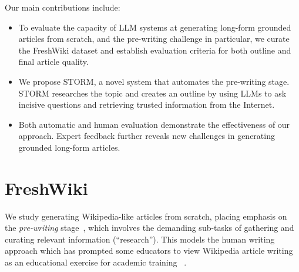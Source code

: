 \documentclass[11pt]{article}
\newcommand{\system}[0]{STORM\xspace}
\begin{document}
Our main contributions include:
\begin{itemize}
\item {To evaluate the capacity of LLM systems at generating long-form grounded articles from scratch, and the pre-writing challenge in particular, we curate the FreshWiki dataset and establish evaluation criteria for both outline and final article quality.}
\item {We propose \system, a novel system that automates the pre-writing stage. \system researches the topic and creates an outline by using LLMs to ask incisive questions and retrieving trusted information from the Internet.}
\item{Both automatic and human evaluation demonstrate the effectiveness of our approach. Expert feedback further reveals new challenges in generating grounded long-form articles.}


\end{itemize}



\section{FreshWiki}

\label{sec:task}


We study generating Wikipedia-like articles from scratch, placing emphasis on the \textit{pre-writing} stage~\citep{rohman1965pre}, which involves the demanding sub-tasks of gathering and curating relevant information (``research''). %
This models the human writing approach which has prompted
some educators to view %
Wikipedia article writing 
as an educational exercise for academic training%
~\citep{tardy2010writing}.
\end{document}
